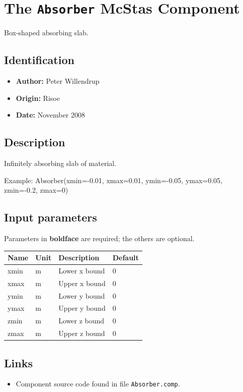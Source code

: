 \section{The \texttt{Absorber} McStas Component}
Box-shaped absorbing slab.

\subsection*{Identification}
\begin{itemize}
  \item \textbf{Author:} Peter Willendrup
  \item \textbf{Origin:} Risoe
  \item \textbf{Date:} November 2008
\end{itemize}

\subsection*{Description}
Infinitely absorbing slab of material.

Example: Absorber(xmin=-0.01, xmax=0.01, ymin=-0.05, ymax=0.05, zmin=-0.2, zmax=0)

\subsection*{Input parameters}
Parameters in \textbf{boldface} are required; the others are optional.

\begin{longtable}{p{}p{}p{}p{}}
\toprule
\textbf{Name} & \textbf{Unit} & \textbf{Description} & \textbf{Default} \\
\midrule
\endhead
xmin & m & Lower x bound & 0 \\
xmax & m & Upper x bound & 0 \\
ymin & m & Lower y bound & 0 \\
ymax & m & Upper y bound & 0 \\
zmin & m & Lower z bound & 0 \\
zmax & m & Upper z bound & 0 \\
\bottomrule
\end{longtable}

\subsection*{Links}
\begin{itemize}
  \item Component source code found in file \texttt{Absorber.comp}.
\end{itemize}

